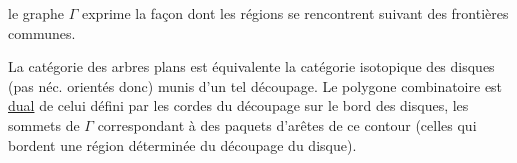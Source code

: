  le graphe $\Gamma$ exprime la façon dont les régions se rencontrent suivant des frontières communes.

La catégorie des arbres plans  est équivalente  la catégorie isotopique des disques  (pas néc. orientés donc) munis d'un tel découpage. Le polygone combinatoire   est \uline{dual} de celui défini par les cordes du découpage sur le bord des disques, les sommets de $\Gamma$ correspondant à des paquets d'arêtes de ce contour (celles qui bordent une région déterminée du découpage  du disque).
